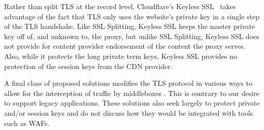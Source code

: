 Rather than split TLS at the record level, Cloudflare's
Keyless SSL~\cite{keyless-ssl} takes advantage of the fact that TLS only uses
the website's private key in a single step of the TLS handshake.
%
%
%
%
Like SSL Splitting, Keyless SSL keeps the master private key off of, and unknown
to, the proxy, but unlike SSL Splitting, Keyless SSL does not provide for
content provider endorsement of the content the proxy serves.  Also,
while it protects the long private term keys, Keyless SSL provides no protection of the session keys from the CDN provider.


A final class of proposed solutions modifies the TLS protocol in various ways
to allow for the interception of traffic by middleboxes
\cite{naylor2015multi,naylor2017and,leematls}.  This is contrary to our desire
to support legacy applications.  These solutions also seek largely to protect
private and/or session keys and do not discuss how they would be integrated
with tools such as WAFs.

%

